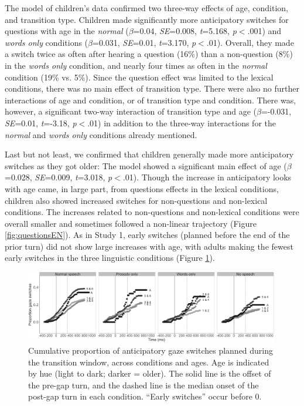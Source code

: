 \documentclass[authoryear, 12pt]{elsarticle}
\begin{document}
The model of children's data confirmed two three-way effects of age, condition, and transition type. Children made significantly more anticipatory switches for questions with age in the \textit{normal} (\textit{$\beta$}=0.04, \textit{SE}=0.008, \textit{t}=5.168, \textit{p}$<$.001) and \textit{words only} conditions (\textit{$\beta$}=0.031, \textit{SE}=0.01, \textit{t}=3.170, \textit{p}$<$.01). Overall, they made a switch twice as often after hearing a question (16\%) than a non-question (8\%) in the \textit{words only} condition, and nearly four times as often in the \textit{normal} condition (19\% vs. 5\%). Since the question effect was limited to the lexical conditions, there was no main effect of transition type. There were also no further interactions of age and condition, or of transition type and condition. There was, however, a significant two-way interaction of transition type and age (\textit{$\beta$}=-0.031, \textit{SE}=0.01, \textit{t}=-3.18, \textit{p}$<$.01) in addition to the three-way interactions for the \textit{normal} and \textit{words only} conditions already mentioned.

Last but not least, we confirmed that children generally made more anticipatory switches as they got older: The model showed a significant main effect of age (\textit{$\beta$}=0.028, \textit{SE}=0.009, \textit{t}=3.018, \textit{p}$<$.01). Though the increase in anticipatory looks with age came, in large part, from questions effects in the lexical conditions, children also showed increased switches for non-questions and non-lexical conditions. The increases related to non-questions and non-lexical conditions were overall smaller and sometimes followed a non-linear trajectory (Figure \ref{fig:questionsEN}). As in Study 1, early switches (planned before the end of the prior turn) did not show large increases with age, with adults making the fewest early switches in the three linguistic conditions (Figure \ref{fig:cumulativeEN}).

\begin{figure}[ht]
\begin{center}
\includegraphics[width=0.99\textwidth]{figures/FIG-cumulative-EN.png}
\end{center}
\caption{Cumulative proportion of anticipatory gaze switches planned during the transition window, across conditions and ages. Age is indicated by hue (light to dark; darker = older). The solid line is the offset of the pre-gap turn, and the dashed line is the median onset of the post-gap turn in each condition. ``Early switches'' occur before 0.} 
\label{fig:cumulativeEN}
\end{figure}
\end{document}
